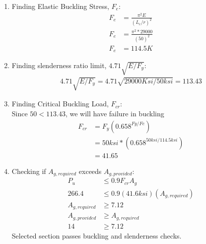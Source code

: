 \documentclass{report} %
\begin{document}
\begin{enumerate}
    \item Finding Elastic Buckling Stress, $F_e$:
        \begin{equation*}
            \begin{aligned}
                F_e &= \frac{\pi^2E}{(L_c/r)^2} \\
                F_e &= \frac{\pi^2*29000}{(50)^2} \\
                F_e &= 114.5K
            \end{aligned}
        \end{equation*}
    \item Finding slenderness ratio limit, $4.71\sqrt{E/F_y}$:
        \begin{equation*}
            \begin{aligned}
                4.71\sqrt{E/F_y} = 4.71\sqrt{29000Ksi/50ksi} = 113.43 
            \end{aligned}
        \end{equation*}
    \item Finding Critical Buckling Load, $F_{cr}$: \\
        Since $50 < 113.43$, we will have failure in buckling 
        \begin{equation*}
            \begin{aligned}
                F_{cr} &= F_y(0.658^{Fy/Fe}) \\
                        &= 50ksi * (0.658^{50ksi/114.5ksi}) \\
                        &= 41.65
            \end{aligned}
        \end{equation*}
    \item Checking if $A_{g,required}$ exceeds $A_{g,provided}$:
        \begin{equation*}
            \begin{aligned}
                P_u &\leq 0.9F_{cr}A_g \\
                266.4 &\leq 0.9(41.6ksi)(A_{g,required}) \\
                A_{g,required} &\geq 7.12 \\
                A_{g,provided} &\geq A_{g,required} \\
                14 &\geq 7.12 
            \end{aligned}
        \end{equation*}
        Selected section passes buckling and slenderness checks.
\end{enumerate}


    
\end{document}
